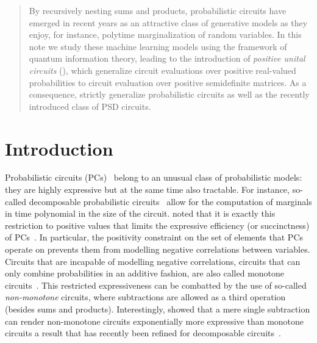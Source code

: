 





\begin{abstract}
	By recursively nesting sums and products, probabilistic circuits have emerged in recent years as an attractive class of generative models as they enjoy, for instance, polytime marginalization of random variables.
	In this note we study these machine learning models using the framework of quantum information theory, leading to the introduction of \textit{positive unital circuits} (\puncs),
	which generalize circuit evaluations over positive real-valued probabilities to circuit evaluation over positive semidefinite matrices.
	As a consequence, \puncs strictly generalize probabilistic circuits as well as the recently introduced class of PSD circuits.
\end{abstract}



\section{Introduction}


Probabilistic circuits (PCs)~\citep{darwiche2003differential,poon2011sum} belong to an unusual class of probabilistic models: they are highly expressive but at the same time also tractable.
For instance, so-called decomposable probabilistic circuits~\citep{darwiche2001decomposable} allow for the computation of marginals in time polynomial in the size of the circuit.
\citet{zhang2020relationship} noted that it is exactly this restriction to positive values that limits the expressive efficiency (or succinctness) of PCs~\citep{martens2014expressive,decolnet2021compilation}. In particular, the positivity constraint on the set of elements that PCs operate on prevents them from modelling negative correlations between variables.
Circuits that are incapable of modelling negative correlations, \ie circuits that can only combine probabilities in an additive fashion, are also called monotone circuits~\citep{shpilka2010arithmetic}.
This restricted expressiveness can be combatted by the use of so-called \textit{non-monotone} circuits, where subtractions are allowed as a third operation (besides sums and products). Interestingly, \citet{valiant1979negation} showed that a mere single subtraction can render non-monotone circuits exponentially more expressive than monotone circuits a result that has recently been refined for decomposable circuits~\citep{loconte2024sum}.

